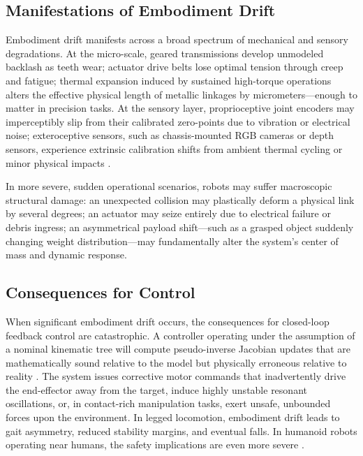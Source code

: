 \documentclass[12pt,a4paper,oneside]{report}
\begin{document}
\subsection{Manifestations of Embodiment Drift}
\label{subsec:manifestations_embodiment_drift}

Embodiment drift manifests across a broad spectrum of mechanical and sensory degradations. At the micro-scale, geared transmissions develop unmodeled backlash as teeth wear; actuator drive belts lose optimal tension through creep and fatigue; thermal expansion induced by sustained high-torque operations alters the effective physical length of metallic linkages by micrometers—enough to matter in precision tasks. At the sensory layer, proprioceptive joint encoders may imperceptibly slip from their calibrated zero-points due to vibration or electrical noise; exteroceptive sensors, such as chassis-mounted RGB cameras or depth sensors, experience extrinsic calibration shifts from ambient thermal cycling or minor physical impacts \cite{rezvani2024robust}.

In more severe, sudden operational scenarios, robots may suffer macroscopic structural damage: an unexpected collision may plastically deform a physical link by several degrees; an actuator may seize entirely due to electrical failure or debris ingress; an asymmetrical payload shift—such as a grasped object suddenly changing weight distribution—may fundamentally alter the system's center of mass and dynamic response.

\subsection{Consequences for Control}
\label{subsec:consequences_control}

When significant embodiment drift occurs, the consequences for closed-loop feedback control are catastrophic. A controller operating under the assumption of a nominal kinematic tree will compute pseudo-inverse Jacobian updates that are mathematically sound relative to the model but physically erroneous relative to reality \cite{siciliano2009robotics}. The system issues corrective motor commands that inadvertently drive the end-effector away from the target, induce highly unstable resonant oscillations, or, in contact-rich manipulation tasks, exert unsafe, unbounded forces upon the environment. In legged locomotion, embodiment drift leads to gait asymmetry, reduced stability margins, and eventual falls. In humanoid robots operating near humans, the safety implications are even more severe \cite{kwiatkowski2019task}.
\end{document}
